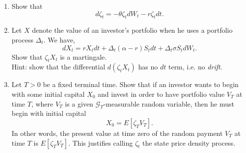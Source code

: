 \documentclass[11pt,a4,table]{article}
\begin{document}
\begin{enumerate}
    \begin{enumerate}
        \item Show that
        \begin{equation*}
            d\zeta_t = -\theta \zeta_t dW_t - r\zeta_t dt.
        \end{equation*}
        
        \item Let $X$ denote the value of an investor's portfolio when he uses a portfolio process $\Delta_t$. We have,
        \begin{equation*}
            dX_t= rX_t dt + \Delta_t(\alpha -r) S_t dt + \Delta_t \sigma S_t dW_t.
        \end{equation*}
        Show that $\zeta_t X_t$ is a martingale.\\
        Hint: show that the differential $d(\zeta_t X_t)$ has no $dt$ term, i.e. no \textit{drift}.
        
        \item Let $T>0$ be a fixed terminal time. Show that if an investor wants to begin with some initial capital $X_0$ and invest in order to have portfolio value $V_T$ at time $T$, where $V_T$ is a given $\mathcal{G}_T$-measurable random variable, then he must begin with initial capital
        \begin{equation*}
            X_0 = E[\zeta_T V_T].
        \end{equation*}
        In other words, the present value at time zero of the random payment $V_T$ at time $T$ is $E[\zeta_T V_T]$. This justifies calling $\zeta_t$ the state price density process.
    \end{enumerate}
    
\end{enumerate}
\end{document}
